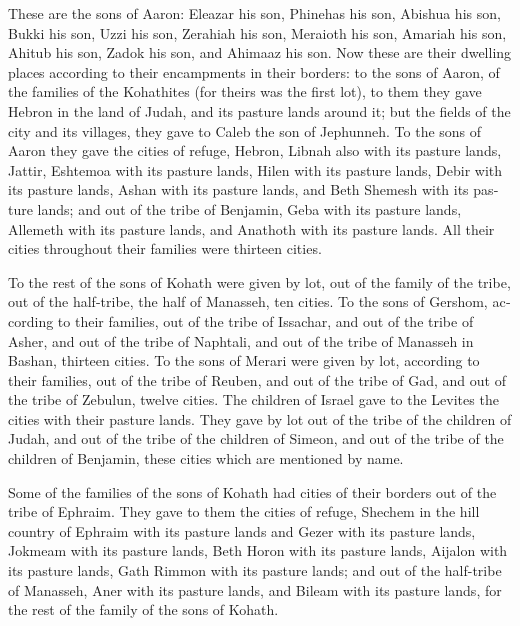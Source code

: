 \begin{paracol}{2}
\begin{otherlanguage}{english}
 These are the sons of Aaron: Eleazar his son, Phinehas
his son, Abishua his son,  Bukki his son, Uzzi his son,
Zerahiah his son,  Meraioth his son, Amariah his son,
Ahitub his son,  Zadok his son, and Ahimaaz his son.
 Now these are their dwelling places according to their
encampments in their borders: to the sons of Aaron, of the families of
the Kohathites (for theirs was the first lot),  to them
they gave Hebron in the land of Judah, and its pasture lands around it;
 but the fields of the city and its villages, they gave
to Caleb the son of Jephunneh.  To the sons of Aaron they
gave the cities of refuge, Hebron, Libnah also with its pasture lands,
Jattir, Eshtemoa with its pasture lands,  Hilen with its
pasture lands, Debir with its pasture lands,  Ashan with
its pasture lands, and Beth Shemesh with its pasture lands;
 and out of the tribe of Benjamin, Geba with its pasture
lands, Allemeth with its pasture lands, and Anathoth with its pasture
lands. All their cities throughout their families were thirteen cities.

 To the rest of the sons of Kohath were given by lot, out
of the family of the tribe, out of the half-tribe, the half of Manasseh,
ten cities.  To the sons of Gershom, according to their
families, out of the tribe of Issachar, and out of the tribe of Asher,
and out of the tribe of Naphtali, and out of the tribe of Manasseh in
Bashan, thirteen cities.  To the sons of Merari were
given by lot, according to their families, out of the tribe of Reuben,
and out of the tribe of Gad, and out of the tribe of Zebulun, twelve
cities.  The children of Israel gave to the Levites the
cities with their pasture lands.  They gave by lot out of
the tribe of the children of Judah, and out of the tribe of the children
of Simeon, and out of the tribe of the children of Benjamin, these
cities which are mentioned by name.

 Some of the families of the sons of Kohath had cities of
their borders out of the tribe of Ephraim.  They gave to
them the cities of refuge, Shechem in the hill country of Ephraim with
its pasture lands and Gezer with its pasture lands, 
Jokmeam with its pasture lands, Beth Horon with its pasture lands,
 Aijalon with its pasture lands, Gath Rimmon with its
pasture lands;  and out of the half-tribe of Manasseh,
Aner with its pasture lands, and Bileam with its pasture lands, for the
rest of the family of the sons of Kohath.


\end{otherlanguage}
\end{paracol}
